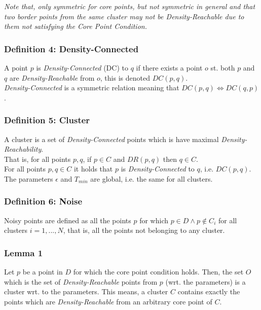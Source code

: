\textit{Note that, only symmetric for core points, but not symmetric in general and that two border points from the same cluster may not be \textit{Density-Reachable} due to them not satisfying the Core Point Condition.}

\subsubsection*{Definition 4: Density-Connected}
A point $p$ is \textit{Density-Connected} (DC) to $q$ if there exists a point $o$ st. both $p$ and $q$ are \textit{Density-Reachable} from $o$, this is denoted $DC(p,q)$.\\

\textit{Density-Connected} is a symmetric relation meaning that $DC(p,q) \iff DC(q,p)$.

\subsubsection*{Definition 5: Cluster}
A cluster is a set of \textit{Density-Connected} points which is have maximal \textit{Density-Reachability}.\\

That is, for all points $p,q$, if $p \in C$ and $DR(p,q)$ then $q \in C$.\\

For all points $p,q \in C$ it holds that $p$ is \textit{Density-Connected} to $q$, i.e. $DC(p,q)$.\\

The parameters $\epsilon$ and $T_{min}$ are global, i.e. the same for all clusters.

\subsubsection*{Definition 6: Noise}
Noisy points are defined as all the points $p$ for which $p \in D \wedge p \notin C_i$ for all clusters $i = 1,...,N$, that is, all the points not belonging to any cluster.

\subsubsection*{Lemma 1}
Let $p$ be a point in $D$ for which the core point condition holds. Then, the set $O$ which is the set of \textit{Density-Reachable} points from $p$ (wrt. the parameters) is a cluster wrt. to the parameters. This means, a cluster $C$ contains exactly the points which are \textit{Density-Reachable} from an arbitrary core point of $C$.

